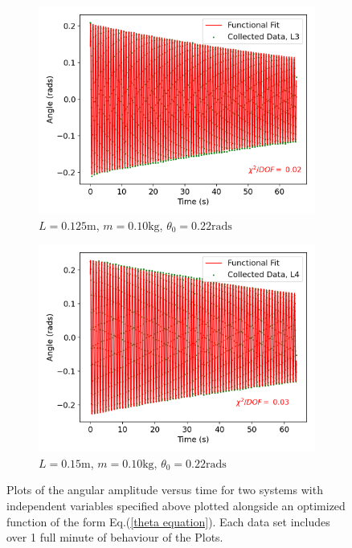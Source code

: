 \begin{figure}[H]
\centering
\begin{subfigure}[t]{0.5\textwidth}
  \centering
  \includegraphics[width=1\textwidth]{Plots/L3.png}
  \caption{\small{$L = 0.125\text{m}$, $m = 0.10\text{kg}$, $\theta_0 = 0.22\text{rads}$}}
  \label{L3}
\end{subfigure}%
\begin{subfigure}[t]{.5\textwidth}
  \centering
  \includegraphics[width=\textwidth]{Plots/L4.png}
  \caption{\small{$L = 0.15\text{m}$, $m = 0.10\text{kg}$, $\theta_0 = 0.22\text{rads}$}}
  \label{L4}
\end{subfigure}
\caption{\small{Plots of the angular amplitude versus time for two systems with independent variables specified above plotted alongside an optimized function of the form Eq.(\ref{theta equation}). Each data set includes over 1 full minute of behaviour of the Plots.}}
\end{figure}


